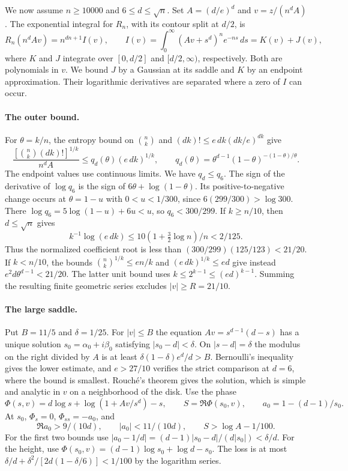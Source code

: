 We now assume \(n\ge10000\) and \(6\le d\le\sqrt n\).
Set \(A=(d/e)^d\) and \(v=z/(n^d A)\).
The exponential integral for \(R_n\), with its contour split
at \(d/2\), is
\[
 R_n(n^d A v)=n^{dn+1}I(v),\qquad
 I(v)=\int_0^\infty(Av+s^d)^n e^{-ns}\,ds=K(v)+J(v),
\]
where \(K\) and \(J\) integrate over \([0,d/2]\) and
\([d/2,\infty)\), respectively. Both are polynomials in \(v\).
We bound \(J\) by a Gaussian at its saddle and \(K\) by an
endpoint approximation. Their logarithmic derivatives are
separated where a zero of \(I\) can occur.

\paragraph{The outer bound.}
For \(\theta=k/n\), the entropy bound on \(\binom nk\) and
\((dk)!\le e\,dk(dk/e)^{dk}\) give
\[
 \frac{[\binom nk(dk)!]^{1/k}}{n^d A}
 \le q_d(\theta)(e\,dk)^{1/k},\qquad
 q_d(\theta)=\theta^{d-1}(1-\theta)^{-(1-\theta)/\theta}.
\]
The endpoint values use continuous limits. We have \(q_d\le q_6\).
The sign of the derivative of \(\log q_6\) is the sign of
\(6\theta+\log(1-\theta)\). Its positive-to-negative change
occurs at \(\theta=1-u\) with \(0<u<1/300\), since
\(6(299/300)>\log300\).
There \(\log q_6=5\log(1-u)+6u<u\), so \(q_6<300/299\).
If \(k\ge n/10\), then \(d\le\sqrt n\) gives
\[
 k^{-1}\log(e\,dk)\le10(1+\tfrac32\log n)/n<2/125.
\]
Thus the normalized coefficient root is less than
\((300/299)(125/123)<21/20\).
If \(k<n/10\), the bounds
\(\binom nk^{1/k}\le en/k\) and \((e\,dk)^{1/k}\le ed\)
give instead \(e^2 d\theta^{d-1}<21/20\).
The latter unit bound uses \(k\le2^{k-1}\le(ed)^{k-1}\).
Summing the resulting finite geometric series excludes
\(|v|\ge R=21/10\).

\paragraph{The large saddle.}
Put \(B=11/5\) and \(\delta=1/25\). For \(|v|\le B\) the
equation \(A v=s^{d-1}(d-s)\) has a unique solution
\(s_0=\alpha_0+i\beta_0\) satisfying \(|s_0-d|<\delta\).
On \(|s-d|=\delta\) the modulus on the right divided by \(A\)
is at least \(\delta(1-\delta)e^d/d>B\).
Bernoulli's inequality gives the lower estimate, and \(e>27/10\)
verifies the strict comparison at \(d=6\), where the bound
is smallest. Rouch\'e's theorem gives the solution, which
is simple and analytic in \(v\) on a neighborhood of the disk.
Use the phase
\[
 \Phi(s,v)=d\log s+\log(1+A v/s^d)-s,\qquad
 S=\Re\Phi(s_0,v),\qquad a_0=1-(d-1)/s_0 .
\]
At \(s_0\), \(\Phi_s=0\), \(\Phi_{ss}=-a_0\), and
\begin{equation}
 \Re a_0>9/(10d),\qquad |a_0|<11/(10d),\qquad
 S>\log A-1/100 .
 \label{eq:constant-saddle-bounds}
\end{equation}
For the first two bounds use
\(|a_0-1/d|=(d-1)|s_0-d|/(d|s_0|)<\delta/d\).
For the height, use
\(\Phi(s_0,v)=(d-1)\log s_0+\log d-s_0\).
The loss is at most \(\delta/d+\delta^2/[2d(1-\delta/6)]<1/100\)
by the logarithm series.

